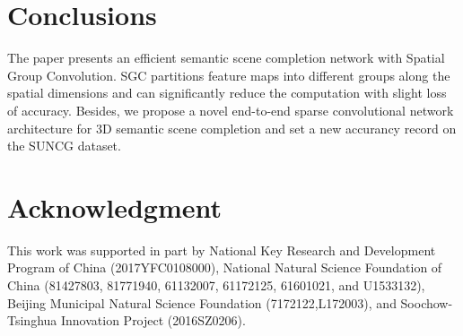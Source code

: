 \documentclass[runningheads]{llncs}
\begin{document}
\section{Conclusions}
The paper presents an efficient semantic scene completion network with Spatial Group Convolution. SGC partitions feature maps into different groups along the spatial dimensions and can significantly reduce the computation with slight loss of accuracy. Besides, we propose a novel end-to-end sparse convolutional network architecture for 3D semantic scene completion and set a new accurancy record on the SUNCG dataset.

\section*{Acknowledgment}
This work was supported in part by National Key Research and Development Program of China (2017YFC0108000), National Natural Science Foundation of China (81427803, 81771940, 61132007, 61172125, 61601021, and U1533132), Beijing Municipal Natural Science Foundation (7172122,L172003), and Soochow-Tsinghua Innovation Project (2016SZ0206).



\end{document}
